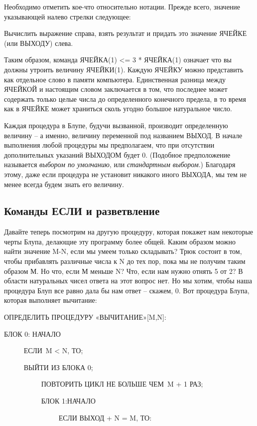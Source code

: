 \documentclass[../main.tex]{subfiles}
\begin{document}
Необходимо отметить кое-что относительно нотации. Прежде всего, значение указывающей налево стрелки следующее:

Вычислить выражение справа, взять результат и придать это значение ЯЧЕЙКЕ (или ВЫХОДУ) слева.

Таким образом, команда ЯЧЕЙКА(1) \textless= 3 * ЯЧЕЙКА(1) означает что вы должны утроить величину ЯЧЕЙКИ(1). Каждую ЯЧЕЙКУ можно представить как отдельное слово в памяти компьютера. Единственная разница между ЯЧЕЙКОЙ и настоящим словом заключается в том, что последнее может содержать только целые числа до определенного конечного предела, в то время как в ЯЧЕЙКЕ может храниться сколь угодно большое натуральное число.

Каждая процедура в Блупе, будучи вызванной, производит определенную величину \--- а именно, величину переменной под названием ВЫХОД\@. В начале выполнения любой процедуры мы предполагаем, что при отсутствии дополнительных указаний ВЫХОДОМ будет 0. (Подобное предположение называется \emph{выбором по умолчанию}, или \emph{стандартным выбором}.) Благодаря этому, даже если процедура не установит никакого иного ВЫХОДА, мы тем не менее всегда будем знать его величину.


\subsection{Команды ЕСЛИ и разветвление}

Давайте теперь посмотрим на другую процедуру, которая покажет нам некоторые черты Блупа, делающие эту программу более общей. Каким образом можно найти значение M-N, если мы умеем только складывать? Трюк состоит в том, чтобы прибавлять различные числа к N до тех пор, пока мы не получим таким образом М\@. Но что, если М меньше N? Что, если нам нужно отнять 5 от 2? В области натуральных чисел ответа на этот вопрос нет. Но мы хотим, чтобы наша процедура Блуп все равно дала бы нам ответ \--- скажем, 0. Вот процедура Блупа, которая выполняет вычитание:

ОПРЕДЕЛИТЬ ПРОЦЕДУРУ «ВЫЧИТАНИЕ»{[}M,N{]}:

БЛОК 0: НАЧАЛО

~~~~~ ЕСЛИ~M \textless{} N, ТО;

~~~~~ ВЫЙТИ ИЗ БЛОКА 0;

~~~~~~~~~~ ПОВТОРИТЬ ЦИКЛ НЕ БОЛЬШЕ ЧЕМ~M + 1 РАЗ;

~~~~~~~~~~ БЛОК 1:НАЧАЛО

~~~~~~~~~~~~~~~ ЕСЛИ ВЫХОД + N = M, ТО:
\end{document}
